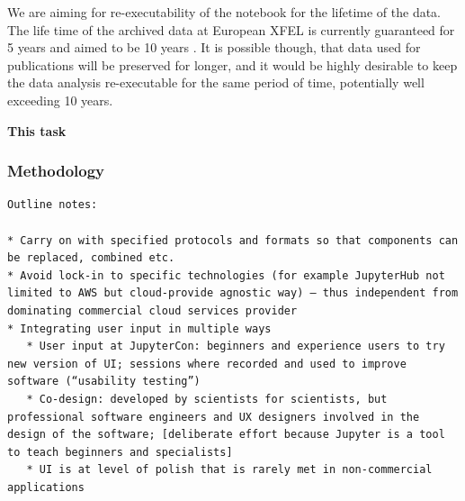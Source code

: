   We are aiming for re-executability of the notebook for the lifetime
  of the data. The life time of the archived data at European XFEL is
  currently guaranteed for 5 years and aimed to be 10 years
  \cite{EuXFEL-datapolicy-2017}. It is possible though, that data used
  for publications will be preserved for longer, and it would be
  highly desirable to keep the data analysis re-executable for the
  same period of time, potentially well exceeding 10 years.

  \medskip \textbf{This task}

\subsubsection{Methodology}\label{sec:methodology}


\begin{verbatim}
Outline notes:

* Carry on with specified protocols and formats so that components can be replaced, combined etc.
* Avoid lock-in to specific technologies (for example JupyterHub not limited to AWS but cloud-provide agnostic way) – thus independent from dominating commercial cloud services provider
* Integrating user input in multiple ways
   * User input at JupyterCon: beginners and experience users to try new version of UI; sessions where recorded and used to improve software (“usability testing”)
   * Co-design: developed by scientists for scientists, but professional software engineers and UX designers involved in the design of the software; [deliberate effort because Jupyter is a tool to teach beginners and specialists]
   * UI is at level of polish that is rarely met in non-commercial applications
\end{verbatim}
